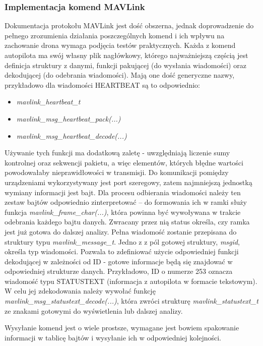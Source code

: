 \subsubsection{Implementacja komend MAVLink}
\label{commands}
Dokumentacja protokołu MAVLink jest dość obszerna, jednak doprowadzenie do pełnego zrozumienia działania poszczególnych komend i ich wpływu na zachowanie drona wymaga podjęcia testów praktycznych.
Każda z komend autopilota ma swój własny plik nagłówkowy, którego najważniejszą częścią jest definicja struktury z danymi, funkcji pakującej (do wysłania wiadomości) oraz dekodującej (do odebrania wiadomości). Mają one dość generyczne nazwy, przykładowo dla wiadomości HEARTBEAT są to odpowiednio:
\begin{itemize}
	\item \textit{mavlink\_heartbeat\_t}
	\item \textit{mavlink\_msg\_heartbeat\_pack(...)}
	\item \textit{mavlink\_msg\_heartbeat\_decode(...)}
\end{itemize}
Używanie tych funkcji ma dodatkową zaletę - uwzględniają liczenie sumy kontrolnej oraz sekwencji pakietu, a więc elementów, których błędne wartości powodowałaby nieprawidłowości w transmisji.
Do komunikacji pomiędzy urządzeniami wykorzystywany jest port szeregowy, zatem najmniejszą jednostką wymiany informacji jest bajt. Dla procesu odbierania wiadomości należy ten zestaw bajtów odpowiednio zinterpretować -- do formowania ich w ramki służy funkcja \textit{mavlink\_frame\_char(...)}, która powinna być wywoływana w trakcie odebrania każdego bajtu danych. Zwracany przez nią status określa, czy ramka jest już gotowa do dalszej analizy. Pełna wiadomość zostanie przepisana do struktury typu \textit{mavlink\_message\_t}. Jedno z z pól gotowej struktury, \textit{msgid}, określa typ wiadomości. Pozwala to zdefiniować użycie odpowiedniej funkcji dekodującej w zależności od ID - gotowe informacje będą się znajdować w odpowiedniej strukturze danych.\newline
Przykładowo, ID o numerze 253 oznacza wiadomość typu STATUSTEXT (informacja z autopilota w formacie tekstowym). W celu jej zdekodowania należy wywołać funkcję 
\textit{mavlink\_msg\_statustext\_decode(...)}, która zwróci strukturę \textit{mavlink\_statustext\_t} ze znakami gotowymi do wyświetlenia lub dalszej analizy.

Wysyłanie komend jest o wiele prostsze, wymagane jest bowiem spakowanie informacji w tablicę bajtów i wysyłanie ich w odpowiedniej kolejności.

